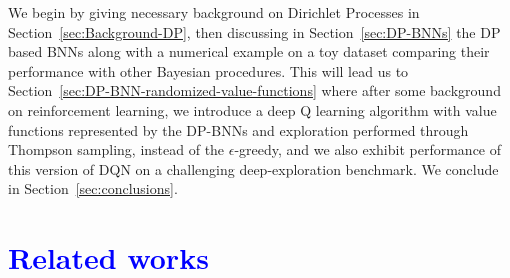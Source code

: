 \documentclass[10pt]{article}
\begin{document}
We begin by giving necessary background on Dirichlet Processes in Section~\ref{sec:Background-DP}, then discussing in Section~\ref{sec:DP-BNNs} the DP based BNNs along with a numerical example on a toy dataset comparing their performance with other Bayesian procedures. This will lead us to Section~\ref{sec:DP-BNN-randomized-value-functions} where after some background on reinforcement learning, we introduce a deep Q learning algorithm with value functions represented by the DP-BNNs and exploration performed through Thompson sampling, instead of the $\epsilon$-greedy, and we also exhibit performance of this version of DQN on a challenging deep-exploration benchmark.  We conclude in Section~\ref{sec:conclusions}.


\section{\textcolor{blue}{Related works}}
\end{document}
